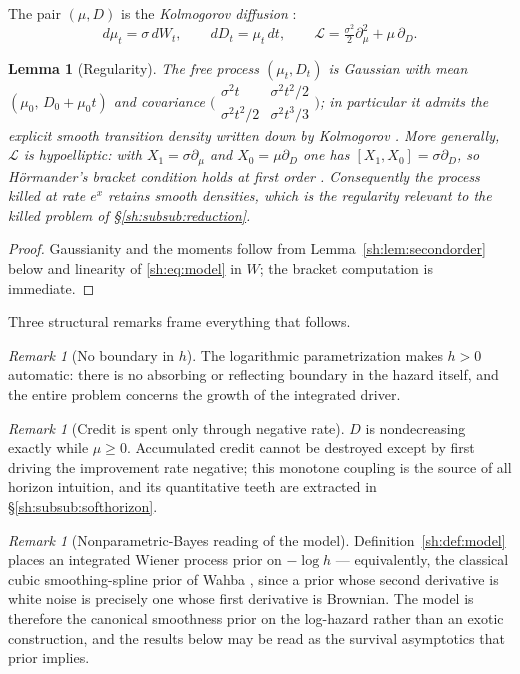 \documentclass[11pt]{article}
\numberwithin{equation}{section}
\theoremstyle{plain}
\newtheorem{lemma}[theorem]{Lemma}
\theoremstyle{definition}
\theoremstyle{remark}
\newtheorem{remark}[theorem]{Remark}
\newcommand{\Lc}{\mathcal{L}}
\begin{document}
The pair $(\mu,D)$ is the \emph{Kolmogorov diffusion} \cite{Kol34}:
\begin{equation}\label{sh:eq:kolm}
d\mu_t=\sigma\,dW_t,\qquad dD_t=\mu_t\,dt,\qquad
\Lc=\tfrac{\sigma^2}{2}\partial_\mu^2+\mu\,\partial_D .
\end{equation}

\begin{lemma}[Regularity]\label{sh:lem:hypo}
The free process $(\mu_t,D_t)$ is Gaussian with mean
$(\mu_0,\,D_0+\mu_0t)$ and covariance
$\bigl(\begin{smallmatrix}\sigma^2t&\sigma^2t^2/2\\
\sigma^2t^2/2&\sigma^2t^3/3\end{smallmatrix}\bigr)$;
in particular it admits the explicit smooth transition density written down
by Kolmogorov \cite{Kol34}. More generally, $\Lc$ is hypoelliptic: with
$X_1=\sigma\partial_\mu$ and $X_0=\mu\partial_D$ one has
$[X_1,X_0]=\sigma\partial_D$, so H\"ormander's bracket condition holds at
first order \cite{Hor67}. Consequently the process killed at rate $e^{x}$
retains smooth densities, which is the regularity relevant to the killed
problem of \S\ref{sh:subsub:reduction}.
\end{lemma}

\begin{proof}
Gaussianity and the moments follow from
Lemma~\ref{sh:lem:secondorder} below and linearity of
\eqref{sh:eq:model} in $W$; the bracket computation is immediate.
\end{proof}

Three structural remarks frame everything that follows.

\begin{remark}[No boundary in $h$]\label{sh:rem:noboundary}
The logarithmic parametrization makes $h>0$ automatic: there is no absorbing
or reflecting boundary in the hazard itself, and the entire problem concerns
the growth of the integrated driver.
\end{remark}

\begin{remark}[Credit is spent only through negative rate]\label{sh:rem:monot}
$D$ is nondecreasing exactly while $\mu\ge0$. Accumulated credit cannot be
destroyed except by first driving the improvement rate negative; this
monotone coupling is the source of all horizon intuition, and its
quantitative teeth are extracted in \S\ref{sh:subsub:softhorizon}.
\end{remark}

\begin{remark}[Nonparametric-Bayes reading of the model]\label{sh:rem:iwp}
Definition~\ref{sh:def:model} places an integrated Wiener process prior on
$-\log h$ --- equivalently, the classical cubic smoothing-spline prior of
Wahba \cite{Wah78}, since a prior whose second derivative is white noise
is precisely one whose first derivative is Brownian. The model is
therefore the canonical smoothness prior on the log-hazard rather than an
exotic construction, and the results below may be read as the survival
asymptotics that prior implies.
\end{remark}
\end{document}
